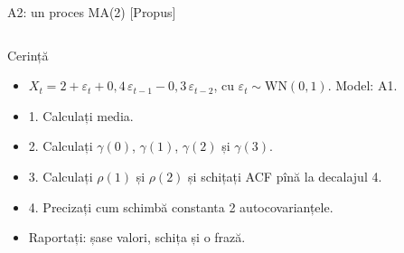 \begin{frame}{A2: un proces MA(2) [Propus]}
\propsub
\itemsize{\scriptsize}
\begin{columns}[T]
\begin{column}{\taskw}
\begin{block}{Cerință}
\begin{itemize}
    \item $X_t = 2 + \varepsilon_t + 0{,}4\,\varepsilon_{t-1} - 0{,}3\,\varepsilon_{t-2}$, cu $\varepsilon_t \sim \mathrm{WN}(0, 1)$. Model: A1.
    \item 1. Calculați media.
    \item 2. Calculați $\gamma(0)$, $\gamma(1)$, $\gamma(2)$ și $\gamma(3)$.
    \item 3. Calculați $\rho(1)$ și $\rho(2)$ și schițați ACF pînă la decalajul 4.
    \item 4. Precizați cum schimbă constanta 2 autocovarianțele.
    \item Raportați: șase valori, schița și o frază.
\end{itemize}
\end{block}
\end{column}
\begin{column}{\solw}
\end{column}
\end{columns}
\end{frame}

